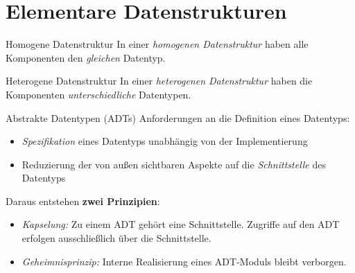 \section{Elementare Datenstrukturen}

\begin{defi}{Homogene Datenstruktur}
    In einer \emph{homogenen Datenstruktur} haben alle Komponenten den \emph{gleichen} Datentyp.
\end{defi}

\begin{defi}{Heterogene Datenstruktur}
    In einer \emph{heterogenen Datenstruktur} haben die Komponenten \emph{unterschiedliche} Datentypen.
\end{defi}

\begin{defi}{Abstrakte Datentypen (ADTs)}
    Anforderungen an die Definition eines Datentyps:
    \begin{itemize}
        \item \emph{Spezifikation} eines Datentyps unabhängig von der Implementierung
        \item Reduzierung der von außen sichtbaren Aspekte auf die \emph{Schnittstelle} des Datentyps
    \end{itemize}

    Daraus entstehen \textbf{zwei Prinzipien}:
    \begin{itemize}
        \item \emph{Kapselung:}
              \subitem Zu einem ADT gehört eine Schnittstelle.
              \subitem Zugriffe auf den ADT erfolgen ausschließlich über die Schnittstelle.
        \item \emph{Geheimnisprinzip:}
              \subitem Interne Realisierung eines ADT-Moduls bleibt verborgen.
    \end{itemize}
\end{defi}

